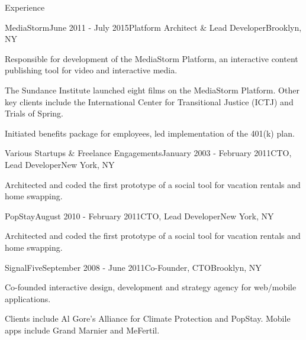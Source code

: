 \documentclass{resume} %
\begin{document}
\begin{rSection}{Experience}
\begin{rSubsection}{MediaStorm}{June 2011 - July 2015}{Platform Architect \& Lead Developer}{Brooklyn, NY}
\item Responsible for development of the MediaStorm Platform, an interactive content publishing tool for video and interactive media. 
\item The Sundance Institute launched eight films on the MediaStorm Platform. Other key clients include the International Center for Transitional Justice (ICTJ) and Trials of Spring. 
\item Initiated benefits package for employees, led implementation of the 401(k) plan.
\end{rSubsection}


\begin{rSubsection}{Various Startups \& Freelance Engagements}{January 2003 - February 2011}{CTO, Lead Developer}{New York, NY}
\item Architected and coded the first prototype of a social tool for vacation rentals and home swapping.
\end{rSubsection}


\begin{rSubsection}{PopStay}{August 2010 - February 2011}{CTO, Lead Developer}{New York, NY}
\item Architected and coded the first prototype of a social tool for vacation rentals and home swapping.
\end{rSubsection}


\begin{rSubsection}{SignalFive}{September 2008 - June 2011}{Co-Founder, CTO}{Brooklyn, NY}
\item Co-founded interactive design, development and strategy agency for web/mobile applications.
\item Clients include Al Gore's Alliance for Climate Protection and PopStay. Mobile apps include Grand Marnier and MeFertil.
\end{rSubsection}


\end{rSection}
\end{document}

